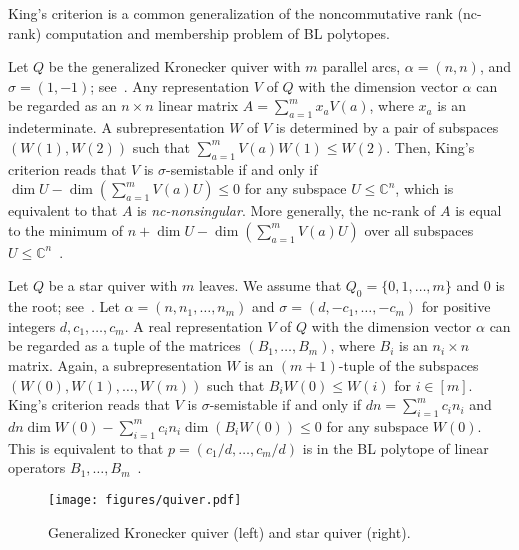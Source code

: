 \documentclass[a4paper,11pt]{article}
\numberwithin{equation}{section}
\newcommand{\C}{\mathbb{C}}
\begin{document}
King's criterion is a common generalization of the noncommutative rank (nc-rank) computation and membership problem of BL polytopes.

\begin{example}[nc-rank]\label{ex:nc-rank}
    Let $Q$ be the generalized Kronecker quiver with $m$ parallel arcs, $\alpha = (n, n)$, and $\sigma = (1,-1)$; see~.
    Any representation $V$ of $Q$ with the dimension vector $\alpha$ can be regarded as an $n \times n$ linear matrix $A = \sum_{a=1}^m x_a V(a)$, where $x_a$ is an indeterminate.
    A subrepresentation $W$ of $V$ is determined by a pair of subspaces $(W(1), W(2))$ such that $\sum_{a=1}^m V(a) W(1) \leq W(2)$.
    Then, King's criterion reads that $V$ is $\sigma$-semistable if and only if $\dim U - \dim(\sum_{a=1}^m V(a) U) \leq 0$ for any subspace $U \leq \C^n$, which is equivalent to that $A$ is \emph{nc-nonsingular}. 
    More generally, the nc-rank of $A$ is equal to the minimum of $n + \dim U - \dim(\sum_{a=1}^m V(a) U)$ over all subspaces $U \leq \C^n$~\citep{Fortin2004}.
\end{example}

\begin{example}[BL polytope]\label{ex:BL polytope}
    Let $Q$ be a star quiver with $m$ leaves.
    We assume that $Q_0 = \{0, 1, \dots, m\}$ and $0$ is the root; see~.
    Let $\alpha = (n, n_1, \dots, n_m)$ and $\sigma = (d, -c_1, \dots, -c_m)$ for positive integers $d, c_1, \dots, c_m$.
    A real representation $V$ of $Q$ with the dimension vector $\alpha$ can be regarded as a tuple of the matrices $(B_1, \dots, B_m)$, where $B_i$ is an $n_i \times n$ matrix.
    Again, a subrepresentation $W$ is an $(m+1)$-tuple of the subspaces $(W(0), W(1), \dots, W(m))$ such that $B_i W(0) \leq W(i)$ for $i \in [m]$.
    King's criterion reads that $V$ is $\sigma$-semistable if and only if $dn = \sum_{i=1}^m c_in_i$ and $dn \dim W(0) - \sum_{i=1}^m c_i n_i \dim (B_i W(0)) \leq 0$ for any subspace $W(0)$.
    This is equivalent to that $p = (c_1/d, \dots, c_m/d)$ is in the BL polytope of linear operators $B_1, \dots, B_m$~\citep{Bennett2008}.
\end{example}

\begin{figure}
    \centering
    \texttt{[image: figures/quiver.pdf]}
    \caption{Generalized Kronecker quiver (left) and star quiver (right).\label{fig:Kr-star-quivers}}
\end{figure}
\end{document}
